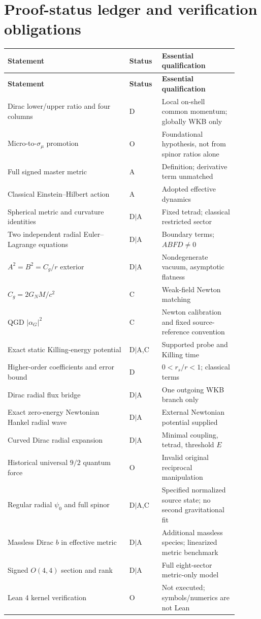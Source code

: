 \documentclass[11pt,a4paper]{article}
\theoremstyle{remark}
\begin{document}
\section{Proof-status ledger and verification obligations}\label{sec:ledger}
\small
\begin{longtable}{p{0.48\linewidth}p{0.12\linewidth}p{0.30\linewidth}}
\toprule
\textbf{Statement} & \textbf{Status} & \textbf{Essential qualification}\\\midrule
\endfirsthead
\toprule
\textbf{Statement} & \textbf{Status} & \textbf{Essential qualification}\\\midrule
\endhead
Dirac lower/upper ratio and four columns & D & Local on-shell common momentum; globally WKB only\\
Micro-to-$\sigma_\mu$ promotion & O & Foundational hypothesis, not from spinor ratios alone\\
Full signed master metric & A & Definition; derivative term unmatched\\
Classical Einstein--Hilbert action & A & Adopted effective dynamics\\
Spherical metric and curvature identities & D$\mid$A & Fixed tetrad; classical restricted sector\\
Two independent radial Euler--Lagrange equations & D$\mid$A & Boundary terms; $ABF D\ne0$\\
$A^2=B^2=C_g/r$ exterior & D$\mid$A & Nondegenerate vacuum, asymptotic flatness\\
$C_g=2G_NM/c^2$ & C & Weak-field Newton matching\\
QGD $|\alpha_G|^2$ & C & Newton calibration and fixed source-reference convention\\
Exact static Killing-energy potential & D$\mid$A,C & Supported probe and Killing time\\
Higher-order coefficients and error bound & D & $0<r_s/r<1$; classical terms\\
Dirac radial flux bridge & D$\mid$A & One outgoing WKB branch only\\
Exact zero-energy Newtonian Hankel radial wave & D$\mid$A & External Newtonian potential supplied\\
Curved Dirac radial expansion & D$\mid$A & Minimal coupling, tetrad, threshold $E$\\
Historical universal $9/2$ quantum force & O & Invalid original reciprocal manipulation\\
Regular radial $\psi_0$ and full spinor & D$\mid$A,C & Specified normalized source state; no second gravitational fit\\
Massless Dirac $b$ in effective metric & D$\mid$A & Additional massless species; linearized metric benchmark\\
Signed $O(4,4)$ section and rank & D$\mid$A & Full eight-sector metric-only model\\
Lean 4 kernel verification & O & Not executed; symbols/numerics are not Lean\\
\bottomrule
\end{longtable}
\normalsize
\end{document}
